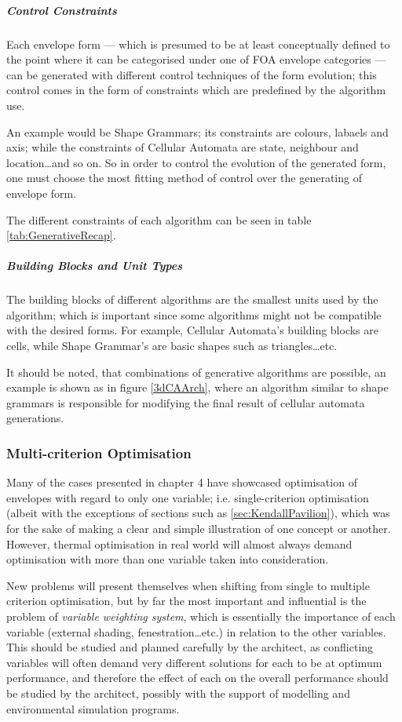 \subparagraph{Control Constraints}

Each envelope form --- which is presumed to be at least conceptually defined to the point where it can be categorised under one of FOA envelope categories --- can be generated with different control techniques of the form evolution; this control comes in the form of constraints which are predefined by the algorithm use.

An example would be Shape Grammars; its constraints are colours, labaels and axis; while the constraints of Cellular Automata are state, neighbour and location\ldots and so on. So in order to control the evolution of the generated form, one must choose the most fitting method of control over the generating of envelope form.

The different constraints of each algorithm can be seen in table \ref{tab:GenerativeRecap}.

\subparagraph{Building Blocks and Unit Types}

The building blocks of different algorithms are the smallest units used by the algorithm; which is important since some algorithms might not be compatible with the desired forms. For example, Cellular Automata's building blocks are cells, while Shape Grammar's are basic shapes such as triangles\ldots{}etc.

It should be noted, that combinations of generative algorithms are possible, an example is shown as in figure \ref{3dCAArch}, where an algorithm similar to shape grammars is responsible for modifying the final result of cellular automata generations.

\subsubsection{Multi-criterion Optimisation}

Many of the cases presented in chapter 4 have showcased optimisation of envelopes with regard to only one variable; i.e. single-criterion optimisation (albeit with the exceptions of sections such as \ref{sec:KendallPavilion}), which was for the sake of making a clear and simple illustration of one concept or another. However, thermal optimisation in real world will almost always demand optimisation with more than one variable taken into consideration.

New problems will present themselves when shifting from single to multiple criterion optimisation, but by far the most important and influential is the problem of \emph{variable weighting system}, which is essentially the importance of each variable (external shading, fenestration\ldots etc.) in relation to the other variables. This should be studied and planned carefully by the architect, as conflicting variables will often demand very different solutions for each to be at optimum performance, and therefore the effect of each on the overall performance should be studied by the architect, possibly with the support of modelling and environmental simulation programs.

